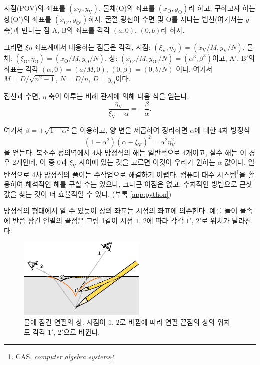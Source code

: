 \documentclass[twocolumn]{article}
\begin{document}
시점(POV)의 좌표를 $(x_{\mathrm{V}}^{}, y_{\mathrm{V}}^{})$, 물체($\mathrm{O}$)의 좌표를 $(x_{\mathrm{O}}^{}, y_{\mathrm{O}}^{})$라 하고, 구하고자 하는 상($\mathrm{O'}$)의 좌표를 $(x_{\mathrm{O'}}^{}, y_{\mathrm{O'}}^{})$\라 하자. 굴절 광선이 수면 및 $\mathrm{O}$를 지나는 법선(여기서는 $y$-축)과 만나는 점 A, B의 좌표를 각각 $(a, 0)$, $(0, b)$라 하자. 

그러면 $\xi\eta$-좌표계에서 대응하는 점들은 각각, 시점: $(\xi_{\mathrm{V}}^{}, \eta_{\mathrm{V}}^{})=(x_{\mathrm{V}}^{}/M, y_{\mathrm{V}}^{}/N)$, 물체: $(\xi_{\mathrm{O}}^{}, \eta_{\mathrm{O}}^{})=(x_{\mathrm{O}}^{}/M, y_{\mathrm{O}}^{}/N)$, 상: $(x_{\mathrm{O'}}^{}/M, y_{\mathrm{O'}}^{}/N)=(\alpha^3, \beta^3)$이고, $\mathrm{A'}$, $\mathrm{B'}$의 좌표는 각각 $(\alpha, 0)=(a/M, 0)$, $(0, \beta)=(0, b/N)$ 이다. 여기서 $M=D/\sqrt{n^2-1}$, $N=D/n$, $D=y_{\mathrm{O}}^{}$이다. 

접선과 수면, $\eta$ 축이 이루는 비례 관계에 의해 다음 식을 얻는다:
$$\dfrac{\eta_{\mathrm{V}}^{}}{\xi_{\mathrm{V}}^{}-\alpha}=-\dfrac{\beta}{\alpha}.$$

여기서 $\beta = \pm \sqrt{1-\alpha^2}$을 이용하고, 양 변을 제곱하여 정리하면 $\alpha$에 대한 4차 방정식
\begin{equation}\label{eqn:tangent}
	\left( 1 - \alpha^2 \right) \left(\alpha-\xi_{\mathrm{V}} \right)^2 = \alpha^2 \eta_{\mathrm{V}}^2
\end{equation}
을 얻는다. 복소수 정의역에서 4차 방정식의 해는 일반적으로 4개이고, 실수 해는 이 경우 2개인데, 이 중 $0$과 $\xi_{\mathrm{V}}$ 사이에 있는 것을 고르면 이것이 우리가 원하는 $\alpha$ 값이다. 일반적으로 4차 방정식의 풀이는 수작업으로 해결하기 어렵다. 컴퓨터 대수 시스템\footnote{CAS, \emph{computer algebra system}}을 활용하여 해석적인 해를 구할 수는 있으나, 크나큰 이점은 없고, 수치적인 방법으로 근삿값을 찾는 것이 더 효율적일 수 있다. (부록 \ref{app:python})

방정식의 형태에서 알 수 있듯이 상의 좌표는 시점의 좌표에 의존한다. 예를 들어 물속에 반쯤 잠긴 연필의 끝점은 그림 \ref{fig:pencil_view}\와 같이 시점 $1$, $2$에 따라 각각 $1'$, $2'$로 위치가 달라진다.

\begin{figure}[h]
	\centering
	\includegraphics[width=2.4in]{figs/g43.eps}
	\caption{물에 잠긴 연필의 상. 시점이 $1$, $2$로 바뀜에 따라 연필 끝점의 상의 위치도 각각 $1'$, $2'$으로 바뀐다.}
	\label{fig:pencil_view}
\end{figure}
\end{document}
